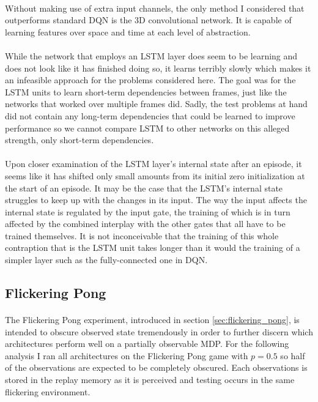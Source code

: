 \paragraph{}
Without making use of extra input channels,
the only method I considered that outperforms standard DQN
is the 3D convolutional network.
It is capable of learning features over space and time
at each level of abstraction.

\paragraph{}
While the network that employs an LSTM layer
does seem to be learning
and does not look like it has finished doing so,
it learns terribly slowly
which makes it an infeasible approach
for the problems considered here.
The goal was for the LSTM units
to learn short-term dependencies between frames,
just like the networks that worked over multiple frames did.
Sadly,
the test problems at hand did not contain any long-term dependencies
that could be learned to improve performance
so we cannot compare LSTM to other networks
on this alleged strength,
only short-term dependencies.

\paragraph{}
Upon closer examination of the LSTM layer's internal state
after an episode,
it seems like it has shifted only small amounts
from its initial zero initialization
at the start of an episode.
It may be the case that the LSTM's internal state
struggles to keep up with the changes in its input.
The way the input affects the internal state
is regulated by the input gate,
the training of which is in turn affected
by the combined interplay with the other gates
that all have to be trained themselves.
It is not inconceivable that the training
of this whole contraption that is the LSTM unit
takes longer than
it would the training of a simpler layer
such as the fully-connected one in DQN.

\subsection{Flickering Pong}
\label{sec:comb_flickering_pong}
\paragraph{}
The Flickering Pong experiment,
introduced in section
\ref{sec:flickering_pong},
is intended to obscure observed state tremendously
in order to further discern which architectures
perform well on a partially observable MDP.
For the following analysis
I ran all architectures
on the Flickering Pong game with $p=0.5$
so half of the observations are expected to be completely obscured.
Each observations is stored in the replay memory as it is perceived
and testing occurs in the same flickering environment.

